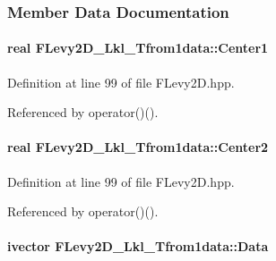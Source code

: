 \subsubsection{\-Member \-Data \-Documentation}
\hypertarget{classFLevy2D__Lkl__Tfrom1data_a65a223e801a809656bd2918d3f57e449}{
\paragraph[{\-Center1}]{\setlength{\rightskip}{0pt plus 5cm}real {\bf \-F\-Levy2\-D\-\_\-\-Lkl\-\_\-\-Tfrom1data\-::\-Center1}}}\label{classFLevy2D__Lkl__Tfrom1data_a65a223e801a809656bd2918d3f57e449}


\-Definition at line 99 of file \-F\-Levy2\-D.\-hpp.



\-Referenced by operator()().

\hypertarget{classFLevy2D__Lkl__Tfrom1data_aeadb884eb472f4b9a7fe739dc636f924}{
\paragraph[{\-Center2}]{\setlength{\rightskip}{0pt plus 5cm}real {\bf \-F\-Levy2\-D\-\_\-\-Lkl\-\_\-\-Tfrom1data\-::\-Center2}}}\label{classFLevy2D__Lkl__Tfrom1data_aeadb884eb472f4b9a7fe739dc636f924}


\-Definition at line 99 of file \-F\-Levy2\-D.\-hpp.



\-Referenced by operator()().

\hypertarget{classFLevy2D__Lkl__Tfrom1data_a164feef005f7cd698ef7e737479376d9}{
\paragraph[{\-Data}]{\setlength{\rightskip}{0pt plus 5cm}ivector {\bf \-F\-Levy2\-D\-\_\-\-Lkl\-\_\-\-Tfrom1data\-::\-Data}}}\label{classFLevy2D__Lkl__Tfrom1data_a164feef005f7cd698ef7e737479376d9}


